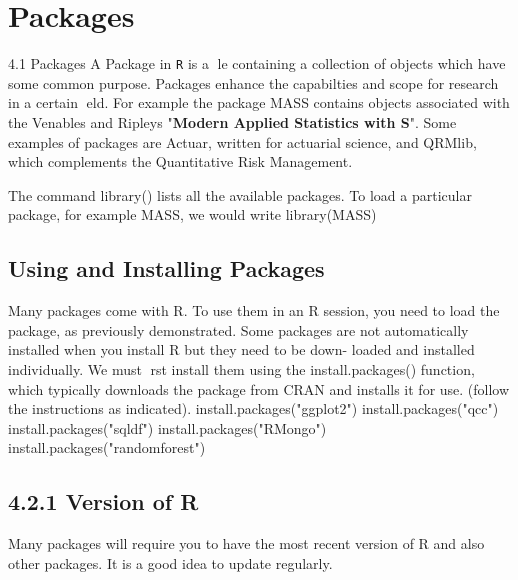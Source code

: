 \section{ Packages }
4.1 Packages
A Package in \texttt{R} is a le containing a collection of objects which have some common purpose.
Packages enhance the capabilties and scope for research in a certain eld. For example the
package MASS contains objects associated with the Venables and Ripleys "\textbf{Modern Applied
Statistics with S}". Some examples of packages are Actuar, written for actuarial science, and
QRMlib, which complements the Quantitative Risk Management.

The command library()
lists all the available packages. To load a particular package, for example MASS, we would
write
library(MASS)
\subsection{ Using and Installing Packages }
Many packages come with R. To use them in an R session, you need to load the package, as
previously demonstrated.
Some packages are not automatically installed when you install R but they need to be down-
loaded and installed individually. We must rst install them using the install.packages()
function, which typically downloads the package from CRAN and installs it for use. (follow the
instructions as indicated).
install.packages("ggplot2")
install.packages("qcc")
install.packages("sqldf")
install.packages("RMongo")
install.packages("randomforest")
\subsection{ 4.2.1 Version of R }
Many packages will require you to have the most recent version of R and also other packages.
It is a good idea to update regularly.
 